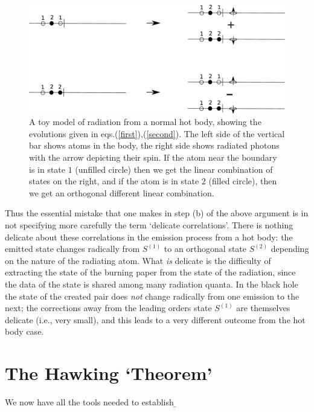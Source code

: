 \documentclass[12pt]{article}
\begin{document}
\begin{figure}[t]
\begin{center}
\includegraphics[scale=.17]{ffive.eps}
\caption{{ A toy model of radiation from a normal hot body, showing the evolutions given in 
eqs.(\ref{first}),(\ref{second}). The left side of the vertical bar shows atoms in the body, the right side shows radiated photons with the arrow depicting their spin. If the atom near the boundary is in state $1$ (unfilled circle) then we get the linear combination of states on the right, and if the atom is in state $2$ (filled circle), then we get an orthogonal different linear combination.}}
\label{ffive}
\end{center}
\end{figure}




Thus the essential mistake that one makes in step (b) of the above argument is in not specifying more carefully the term `delicate correlations'. There is nothing delicate about these correlations in the emission process from a  hot body: the emitted state changes radically from $S^{(1)}$ to an orthogonal state $S^{(2)}$ depending on the nature of the radiating atom. What {\it is} delicate is the difficulty of extracting the state of the burning paper from the state of the radiation, since the data of the state is shared among many radiation quanta. In the black hole the state of the created pair does {\it not} change radically from one emission to the next; the corrections away from the leading orders state $S^{(1)}$ are themselves delicate (i.e., very small), and this leads to a very different outcome from the hot body case. 

\section{The Hawking `Theorem'}

We now have all the tools needed to establish 
\b
\end{document}
